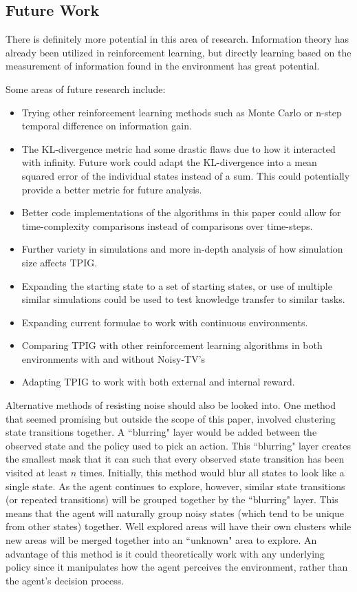 \documentclass[letterpaper]{article} %
\begin{document}
\subsection{Future Work}
There is definitely more potential in this area of research. Information theory has already been utilized in reinforcement learning, but directly learning based on the measurement of information found in the environment has great potential. 

Some areas of future research include:
\begin{itemize}
	\item Trying other reinforcement learning methods such as Monte Carlo or n-step temporal difference on information gain.
	\item The KL-divergence metric had some drastic flaws due to how it interacted with infinity. Future work could adapt the KL-divergence into a mean squared error of the individual states instead of a sum. This could potentially provide a better metric for future analysis.
	\item Better code implementations of the algorithms in this paper could allow for time-complexity comparisons instead of comparisons over time-steps.
	\item Further variety in simulations and more in-depth analysis of how simulation size affects TPIG.
	\item Expanding the starting state to a set of starting states, or use of multiple similar simulations could be used to test knowledge transfer to similar tasks.
	\item Expanding current formulae to work with continuous environments.
	\item Comparing TPIG with other reinforcement learning algorithms in both environments with and without Noisy-TV's
	\item Adapting TPIG to work with both external and internal reward.
\end{itemize}

Alternative methods of resisting noise should also be looked into. One method that seemed promising but outside the scope of this paper, involved clustering state transitions together. A ``blurring" layer would be added between the observed state and the policy used to pick an action. This ``blurring" layer creates the smallest mask that it can such that every observed state transition has been visited at least $n$ times. Initially, this method would blur all states to look like a single state. As the agent continues to explore, however, similar state transitions (or repeated transitions) will be grouped together by the ``blurring" layer. This means that the agent will naturally group noisy states (which tend to be unique from other states) together. Well explored areas will have their own clusters while new areas will be merged together into an ``unknown" area to explore. An advantage of this method is it could theoretically work with any underlying policy since it manipulates how the agent perceives the environment, rather than the agent's decision process.
\end{document}
